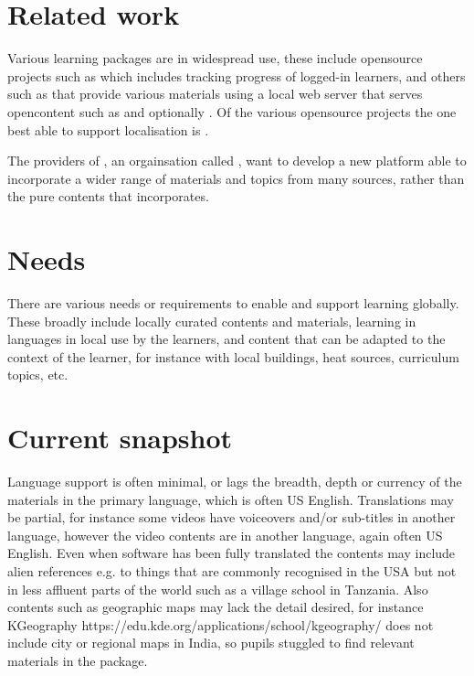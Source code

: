 \documentclass[11pt]{IEEEtran}
\begin{document}












\section{Related work}
Various learning packages are in widespread use, these include opensource projects such as \cite{kalite} which includes tracking progress of logged-in learners, and others such as \cite{rachel} that provide various materials using a local web server that serves opencontent such as \cite{wikipedia-for-schools} and optionally \cite{kalite}. Of the various opensource projects the one best able to support localisation is \cite{kalite}. 

The providers of \cite{kalite}, an orgainsation called \cite{learning-equality}, want to develop a new platform able to incorporate a wider range of materials and topics from many sources, rather than the pure \cite{khanacademy} contents that \cite{kalite} incorporates.

\section{Needs}
There are various needs or requirements to enable and support learning globally. These broadly include locally curated contents and materials, learning in languages in local use by the learners, and content that can be adapted to the context of the learner, for instance with local buildings, heat sources, curriculum topics, etc. 

\section{Current snapshot}
Language support is often minimal, or lags the breadth, depth or currency of the materials in the primary language, which is often US English. Translations may be partial, for instance some videos have voiceovers and/or sub-titles in another language, however the video contents are in another language, again often US English. Even when software has been fully translated the contents may include alien references e.g. to things that are commonly recognised in the USA but not in less affluent parts of the world such as a village school in Tanzania. Also contents such as geographic maps may lack the detail desired, for instance KGeography https://edu.kde.org/applications/school/kgeography/ does not include city or regional maps in India, so pupils stuggled to find relevant materials in the package.
\end{document}
